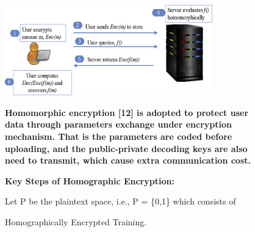 \documentclass[conference]{IEEEtran}
\begin{document}
\begin{figure}
\vspace{\baselineskip}

\includegraphics[width=90mm,scale=0.7]{15.jpg}

\caption{ Homographically Encrypted Training.}

\vspace{\baselineskip}

\textbf{Homomorphic encryption [12] is adopted to protect user data through parameters exchange under encryption mechanism. That is the parameters are coded before uploading, and the public-private decoding keys are also need to transmit, which cause extra communication cost.}

\vspace{\baselineskip}
\vspace{\baselineskip}

\textbf{Key Steps of Homographic Encryption:} 

\vspace{\baselineskip}

Let P be the plaintext space, i.e., P = \{0,1\} which consists of 

\end{figure}
\end{document}
